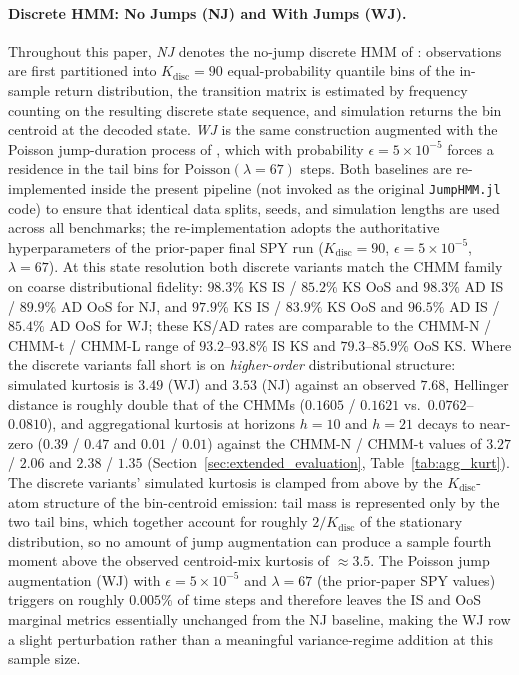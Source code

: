 \paragraph{Discrete HMM: No Jumps (NJ) and With Jumps (WJ).}
Throughout this paper, \emph{NJ} denotes the no-jump discrete HMM of \citet{alswaidan2026hybrid}: observations are first partitioned into $K_{\text{disc}} = 90$ equal-probability quantile bins of the in-sample return distribution, the transition matrix is estimated by frequency counting on the resulting discrete state sequence, and simulation returns the bin centroid at the decoded state.
\emph{WJ} is the same construction augmented with the Poisson jump-duration process of \citet{alswaidan2026hybrid}, which with probability $\epsilon = 5 \times 10^{-5}$ forces a residence in the tail bins for $\text{Poisson}(\lambda = 67)$ steps.
Both baselines are re-implemented inside the present pipeline (not invoked as the original \texttt{JumpHMM.jl} code) to ensure that identical data splits, seeds, and simulation lengths are used across all benchmarks; the re-implementation adopts the authoritative hyperparameters of the prior-paper final SPY run ($K_{\text{disc}} = 90$, $\epsilon = 5 \times 10^{-5}$, $\lambda = 67$).
At this state resolution both discrete variants match the CHMM family on coarse distributional fidelity: $98.3\%$ KS IS / $85.2\%$ KS OoS and $98.3\%$ AD IS / $89.9\%$ AD OoS for NJ, and $97.9\%$ KS IS / $83.9\%$ KS OoS and $96.5\%$ AD IS / $85.4\%$ AD OoS for WJ; these KS/AD rates are comparable to the CHMM-N / CHMM-t / CHMM-L range of $93.2$--$93.8\%$ IS KS and $79.3$--$85.9\%$ OoS KS.
Where the discrete variants fall short is on \emph{higher-order} distributional structure: simulated kurtosis is $3.49$ (WJ) and $3.53$ (NJ) against an observed $7.68$, Hellinger distance is roughly double that of the CHMMs ($0.1605$ / $0.1621$ vs.\ $0.0762$--$0.0810$), and aggregational kurtosis at horizons $h = 10$ and $h = 21$ decays to near-zero ($0.39$ / $0.47$ and $0.01$ / $0.01$) against the CHMM-N / CHMM-t values of $3.27$ / $2.06$ and $2.38$ / $1.35$ (Section~\ref{sec:extended_evaluation}, Table~\ref{tab:agg_kurt}).
The discrete variants' simulated kurtosis is clamped from above by the $K_{\text{disc}}$-atom structure of the bin-centroid emission: tail mass is represented only by the two tail bins, which together account for roughly $2/K_{\text{disc}}$ of the stationary distribution, so no amount of jump augmentation can produce a sample fourth moment above the observed centroid-mix kurtosis of $\approx 3.5$.
The Poisson jump augmentation (WJ) with $\epsilon = 5 \times 10^{-5}$ and $\lambda = 67$ (the prior-paper SPY values) triggers on roughly $0.005\%$ of time steps and therefore leaves the IS and OoS marginal metrics essentially unchanged from the NJ baseline, making the WJ row a slight perturbation rather than a meaningful variance-regime addition at this sample size.
